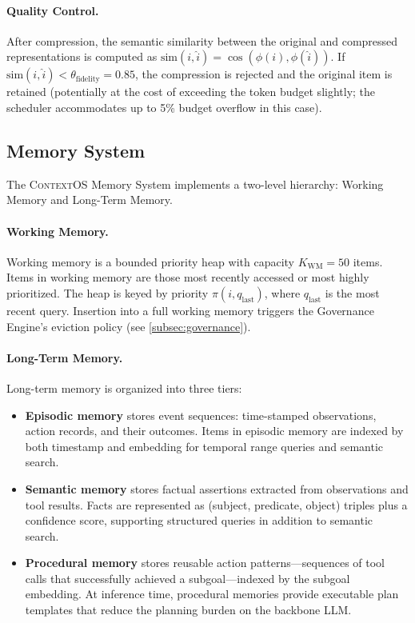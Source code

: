 \documentclass[review,12pt]{elsarticle}
\newcommand{\contextos}{\textsc{ContextOS}}
\newcommand{\prio}{\pi}
\begin{document}
\paragraph{Quality Control.}
After compression, the semantic similarity between the original and compressed
representations is computed as $\text{sim}(i, \hat{i}) = \cos(\phi(i), \phi(\hat{i}))$.
If $\text{sim}(i, \hat{i}) < \theta_{\text{fidelity}} = 0.85$, the compression
is rejected and the original item is retained (potentially at the cost of
exceeding the token budget slightly; the scheduler accommodates up to 5\%
budget overflow in this case).

\subsection{Memory System}
\label{subsec:memory}

The \contextos{} Memory System implements a two-level hierarchy: Working Memory
and Long-Term Memory.

\paragraph{Working Memory.}
Working memory is a bounded priority heap with capacity $K_{\text{WM}} = 50$
items.  Items in working memory are those most recently accessed or most highly
prioritized.  The heap is keyed by priority $\prio(i, q_{\text{last}})$, where
$q_{\text{last}}$ is the most recent query.  Insertion into a full working
memory triggers the Governance Engine's eviction policy (see
\cref{subsec:governance}).

\paragraph{Long-Term Memory.}
Long-term memory is organized into three tiers:
\begin{itemize}
  \item \textbf{Episodic memory} stores event sequences: time-stamped
  observations, action records, and their outcomes.  Items in episodic memory
  are indexed by both timestamp and embedding for temporal range queries and
  semantic search.
  \item \textbf{Semantic memory} stores factual assertions extracted from
  observations and tool results.  Facts are represented as (subject, predicate,
  object) triples plus a confidence score, supporting structured queries in
  addition to semantic search.
  \item \textbf{Procedural memory} stores reusable action patterns—sequences of
  tool calls that successfully achieved a subgoal—indexed by the subgoal
  embedding.  At inference time, procedural memories provide executable plan
  templates that reduce the planning burden on the backbone LLM.
\end{itemize}
\end{document}
